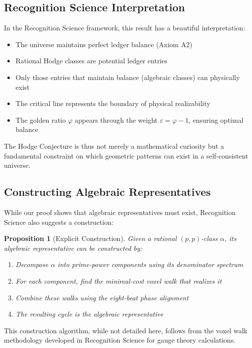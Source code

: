 \documentclass[12pt]{article}
\newtheorem{proposition}[theorem]{Proposition}
\theoremstyle{definition}
\theoremstyle{remark}
\begin{document}
\subsection{Recognition Science Interpretation}

In the Recognition Science framework, this result has a beautiful interpretation:

\begin{itemize}
\item The universe maintains perfect ledger balance (Axiom A2)
\item Rational Hodge classes are potential ledger entries
\item Only those entries that maintain balance (algebraic classes) can physically exist
\item The critical line represents the boundary of physical realizability
\item The golden ratio $\varphi$ appears through the weight $\varepsilon = \varphi - 1$, ensuring optimal balance
\end{itemize}

The Hodge Conjecture is thus not merely a mathematical curiosity but a fundamental constraint on which geometric patterns can exist in a self-consistent universe.

\subsection{Constructing Algebraic Representatives}

While our proof shows that algebraic representatives must exist, Recognition Science also suggests a construction:

\begin{proposition}[Explicit Construction]
Given a rational $(p,p)$-class $\alpha$, its algebraic representative can be constructed by:
\begin{enumerate}
\item Decompose $\alpha$ into prime-power components using its denominator spectrum
\item For each component, find the minimal-cost voxel walk that realizes it
\item Combine these walks using the eight-beat phase alignment
\item The resulting cycle is the algebraic representative
\end{enumerate}
\end{proposition}

This construction algorithm, while not detailed here, follows from the voxel walk methodology developed in Recognition Science for gauge theory calculations.
\end{document}
